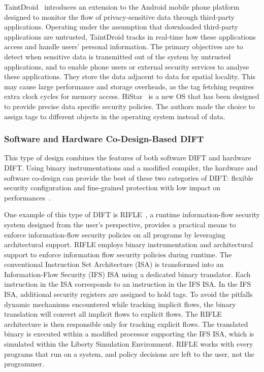 TaintDroid~\cite{EGHTCCJMS-14-tocs} introduces an extension to the Android mobile phone platform designed to monitor the flow of privacy-sensitive data through third-party applications. Operating under the assumption that downloaded third-party applications are untrusted, TaintDroid tracks in real-time how these applications access and handle users’ personal information. The primary objectives are to detect when sensitive data is transmitted out of the system by untrusted applications, and to enable phone users or external security services to analyse these applications. They store the data adjacent to data for spatial locality. This may cause large performance and storage overheads, as the tag fetching requires extra clock cycles for memory access.
HiStar~\cite{ZBKM-11-commacm} is a new OS that has been designed to provide precise data specific security policies. The authors made the choice to assign tags to different objects in the operating system instead of data.


\subsubsection{Software and Hardware Co-Design-Based DIFT}
This type of design combines the features of both software DIFT and hardware DIFT. Using binary instrumentations and a modified compiler, the hardware and software co-design can provide the best of these two categories of DIFT: flexible security configuration and fine-grained protection with low impact on performances~\cite{CGDJ-21-micromac, BSMCVEJCO-21-acmcsur}.

One example of this type of DIFT is RIFLE~\cite{VBCROBRVA-04-micro}, a runtime information-flow security system designed from the user's perspective, provides a practical means to enforce information-flow security policies on all programs by leveraging architectural support.
RIFLE employs binary instrumentation and architectural support to enforce information flow security policies during runtime. The conventional Instruction Set Architecture (ISA) is transformed into an Information-Flow Security (IFS) ISA using a dedicated binary translator. Each instruction in the ISA corresponds to an instruction in the IFS ISA. 
In the IFS ISA, additional security registers are assigned to hold tags. To avoid the pitfalls dynamic mechanisms encountered while tracking implicit flows, the binary translation will convert all implicit flows to explicit flows. The RIFLE architecture is then responsible only for tracking explicit flows. The translated binary is executed within a modified processor supporting the IFS ISA, which is simulated within the Liberty Simulation Environment. RIFLE works with every programs that run on a system, and policy decisions are left to the user, not the programmer.

